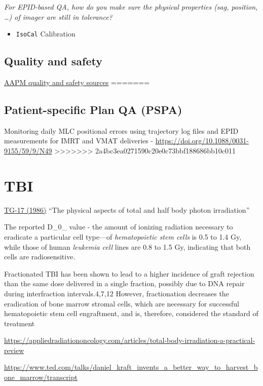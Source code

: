 \documentclass[]{book}
\providecommand{\tightlist}{%
  \setlength{\itemsep}{0pt}\setlength{\parskip}{0pt}}
\theoremstyle{definition}
\theoremstyle{definition}
\theoremstyle{definition}
\theoremstyle{remark}
\begin{document}
\emph{For EPID-based QA, how do you make sure the physical properties
(sag, position, \ldots{}) of imager are still in tolerance?}

\begin{itemize}
\tightlist
\item
  \texttt{IsoCal} Calibration
\end{itemize}

\section{Quality and safety}\label{quality-and-safety}

\href{https://www.aapm.org/QualitySafety/default.asp}{AAPM quality and
safety sources}
=======
\section{Patient-specific Plan QA
(PSPA)}\label{patient-specific-plan-qa-pspa}

Monitoring daily MLC positional errors using trajectory log files and
EPID measurements for IMRT and VMAT deliveries -
\url{https://doi.org/10.1088/0031-9155/59/9/N49}
>>>>>>> 2a4bc3ea0271590c20e0c73bbf188686bb10c011

\chapter{TBI}\label{tbi}

\href{https://aapm.org/pubs/reports/RPT_17.pdf}{TG-17 (1986)} ``The
physical aspects of total and half body photon irradiation''

The reported D\_0\_ value - the amount of ionizing radiation necessary
to eradicate a particular cell type---of \emph{hematopoietic stem cells}
is 0.5 to 1.4 Gy, while those of human \emph{leukemia cell} lines are
0.8 to 1.5 Gy, indicating that both cells are radiosensitive.

Fractionated TBI has been shown to lead to a higher incidence of graft
rejection than the same dose delivered in a single fraction, possibly
due to DNA repair during interfraction intervals.4,7,12 However,
fractionation decreases the eradication of bone marrow stromal cells,
which are necessary for successful hematopoietic stem cell engraftment,
and is, therefore, considered the standard of treatment

\url{https://appliedradiationoncology.com/articles/total-body-irradiation-a-practical-review}

\url{https://www.ted.com/talks/daniel_kraft_invents_a_better_way_to_harvest_bone_marrow/transcript}
\end{document}
